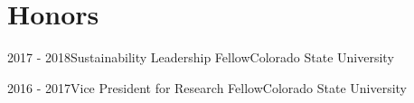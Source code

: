 \documentclass[letterpaper]{twentysecondcv} %
\begin{document}

%



\section{Honors}

\begin{twenty} %



\twentyitem
    	{2017 - 2018}{}{Sustainability Leadership Fellow}{Colorado State University}
        {}
        { {} } 

\twentyitem
    	{2016 - 2017}{}{Vice President for Research Fellow}{Colorado State University}
        {}
        { {} }  
        
        
\end{twenty}
\end{document}
